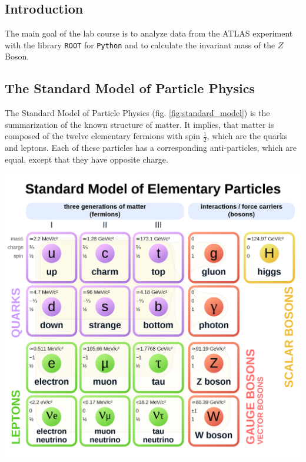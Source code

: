 \documentclass[12pt, a4paper, bibliography=totoc]{scrartcl}
\begin{document}
\tableofcontents
\newpage
\begin{multicols}{2}
\section{Introduction}

The main goal of the lab course is to analyze data from the ATLAS experiment with the library \verb*+ROOT+ for \verb*+Python+ and to calculate the invariant mass of the $Z$ Boson. 

\subsection{The Standard Model of Particle Physics}

The Standard Model of Particle Physics (fig. \ref{fig:standard_model}) is the summarization of the known structure of matter.
It implies, that matter is composed of the twelve elementary fermions with spin $\frac{1}{2}$, which are the quarks and leptons. 
Each of these particles has a corresponding anti-particles, which are equal, except that they have opposite charge.

    \begin{center}
\label{fig:standard_model}
    \includegraphics[width=0.9\linewidth]{fig/standard_model.png}
    \end{center}


\end{multicols}
\end{document}
